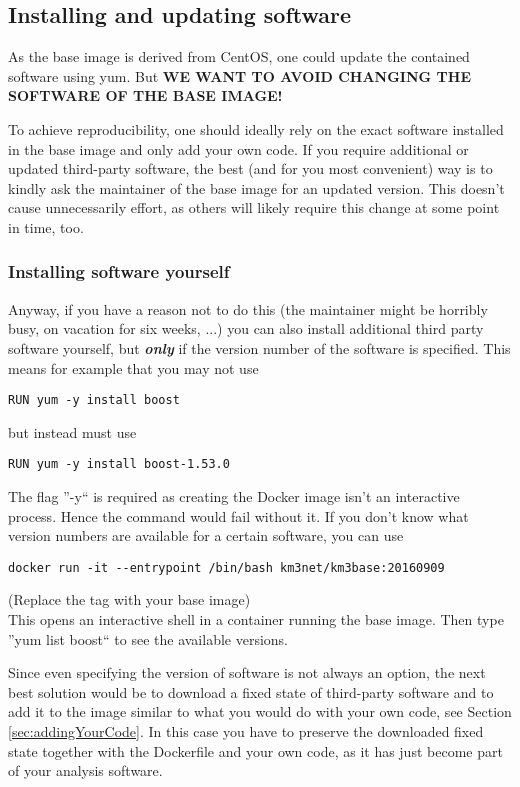 \documentclass[a4paper, twoside, 11pt]{article}
\begin{document}
\subsection{Installing and updating software}
\label{sec:installSoftware}
As the base image is derived from CentOS, one could update the contained software using yum. 
But \textbf{WE WANT TO AVOID CHANGING THE SOFTWARE OF THE BASE IMAGE!}

To achieve reproducibility, one should ideally rely on the exact software installed in the base image and only add your own code. 
If you require additional or updated third-party software, the best (and for you most convenient) way 
is to kindly ask the maintainer of the base image for an updated version. 
This doesn't cause unnecessarily effort, 
as others will likely require this change at some point in time, too. 

\subsubsection{Installing software yourself}
Anyway, if you have a reason not to do this (the maintainer might be horribly busy, on vacation for six weeks, ...) 
you can also install additional third party software yourself, 
but \textbf{\textit{only}} if the version number of the software is specified. 
This means for example that you may not use 
\begin{lstlisting}[basicstyle=\footnotesize\ttfamily,frame=single]
RUN yum -y install boost 
\end{lstlisting}
but instead must use 
\begin{lstlisting}[basicstyle=\footnotesize\ttfamily,frame=single]
RUN yum -y install boost-1.53.0
\end{lstlisting}
The flag ''-y`` is required as creating the Docker image isn't an interactive process. 
Hence the command would fail without it. 
If you don't know what version numbers are available for a certain software, you can use 
\begin{lstlisting}[basicstyle=\footnotesize\ttfamily,frame=single]
docker run -it --entrypoint /bin/bash km3net/km3base:20160909
\end{lstlisting}
(Replace the tag with your base image) \\
This opens an interactive shell in a container running the base image. 
Then type ''yum list boost`` to see the available versions. 

Since even specifying the version of software is not always an option, 
the next best solution would be to download a fixed state of third-party software 
and to add it to the image similar to what you would do with your own code, 
see Section \ref{sec:addingYourCode}. 
In this case you have to preserve the downloaded fixed state together with the Dockerfile and your own code, 
as it has just become part of your analysis software. 
\end{document}
